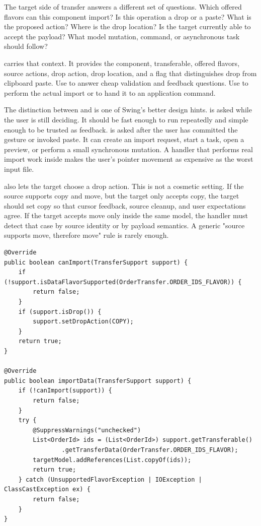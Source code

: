 The target side of transfer answers a different set of questions. Which offered flavors can this component import? Is this operation a drop or a paste? What is the proposed action? Where is the drop location? Is the target currently able to accept the payload? What model mutation, command, or asynchronous task should follow?

 carries that context. It provides the component, transferable, offered flavors, source actions, drop action, drop location, and a flag that distinguishes drop from clipboard paste. Use  to answer cheap validation and feedback questions. Use  to perform the actual import or to hand it to an application command.

The distinction between  and  is one of Swing's better design hints.  is asked while the user is still deciding. It should be fast enough to run repeatedly and simple enough to be trusted as feedback.  is asked after the user has committed the gesture or invoked paste. It can create an import request, start a task, open a preview, or perform a small synchronous mutation. A handler that performs real import work inside  makes the user's pointer movement as expensive as the worst input file.

 also lets the target choose a drop action. This is not a cosmetic setting. If the source supports copy and move, but the target only accepts copy, the target should set copy so that cursor feedback, source cleanup, and user expectations agree. If the target accepts move only inside the same model, the handler must detect that case by source identity or by payload semantics. A generic "source supports move, therefore move" rule is rarely enough.

\begin{lstlisting}[caption={Importing order IDs into a target model.}]
@Override
public boolean canImport(TransferSupport support) {
    if (!support.isDataFlavorSupported(OrderTransfer.ORDER_IDS_FLAVOR)) {
        return false;
    }
    if (support.isDrop()) {
        support.setDropAction(COPY);
    }
    return true;
}

@Override
public boolean importData(TransferSupport support) {
    if (!canImport(support)) {
        return false;
    }
    try {
        @SuppressWarnings("unchecked")
        List<OrderId> ids = (List<OrderId>) support.getTransferable()
                .getTransferData(OrderTransfer.ORDER_IDS_FLAVOR);
        targetModel.addReferences(List.copyOf(ids));
        return true;
    } catch (UnsupportedFlavorException | IOException | ClassCastException ex) {
        return false;
    }
}
\end{lstlisting}

